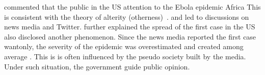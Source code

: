  commented that the public in the US  attention to the Ebola epidemic  Africa 
This is consistent with the theory of alterity (otherness)~\cite{otherness}.
   and led to  discussions on news media and Twitter.
 further explained  the spread of the first case in the US also disclosed another phenomenon.
Since the news media reported the first case wantonly, the severity of the epidemic was overestimated and  created among average .
This is  is often influenced by the pseudo society built by the media.
Under such  situation, the government  guide public opinion.

